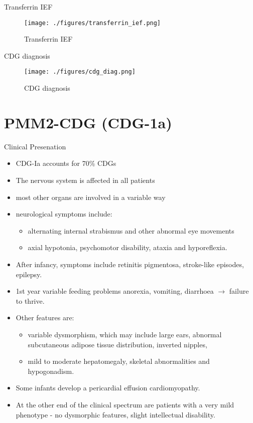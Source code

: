 \documentclass[presentation, smaller]{beamer}
\begin{document}
\begin{frame}[label={sec:orgde8c3fb}]{Transferrin IEF}
\begin{figure}[htbp]
\centering
\texttt{[image: ./figures/transferrin\_ief.png]}
\caption{\label{fig:orgd4a157a}
Transferrin IEF}
\end{figure}
\end{frame}


\begin{frame}[label={sec:org802de3c}]{CDG diagnosis}
\begin{figure}[htbp]
\centering
\texttt{[image: ./figures/cdg\_diag.png]}
\caption{\label{fig:orgf25d3b5}
CDG diagnosis}
\end{figure}
\end{frame}

\section{PMM2-CDG (CDG-1a)}
\label{sec:org7dd8b5f}

\begin{frame}[label={sec:org456a18d}]{Clinical Presenation}
\begin{itemize}
\item CDG-Ia accounts for 70\% CDGs
\item The nervous system is affected in all patients
\item most other organs are involved in a variable way
\item neurological symptoms include:
\begin{itemize}
\item alternating internal strabismus and other abnormal eye movements
\item axial hypotonia, psychomotor disability, ataxia and hyporeflexia.
\end{itemize}
\item After infancy, symptoms include retinitis pigmentosa, stroke-like episodes, \textpm{} epilepsy.
\item 1st year variable feeding problems anorexia, vomiting, diarrhoea \(\to\) failure to thrive.
\item Other features are:
\begin{itemize}
\item variable dysmorphism, which may include large ears, abnormal
subcutaneous adipose tissue distribution, inverted nipples,
\item mild to moderate hepatomegaly, skeletal abnormalities and hypogonadism.
\end{itemize}
\item Some infants develop a pericardial effusion \textpm{} cardiomyopathy.
\item At the other end of the clinical spectrum are patients with a very
mild phenotype - no dysmorphic features, slight intellectual disability.
\end{itemize}
\end{frame}
\end{document}
